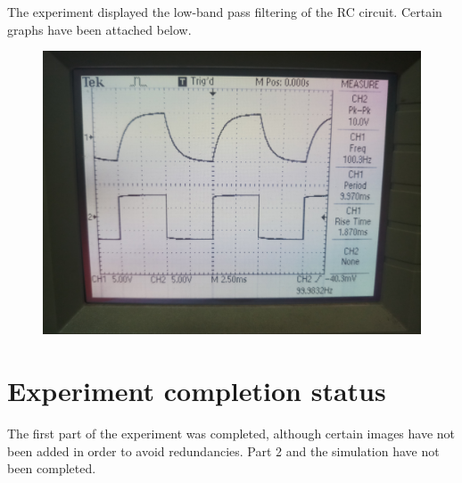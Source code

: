 \documentclass[12pt]{article}
\begin{document}
The experiment displayed the low-band pass filtering of the RC circuit. Certain graphs have been attached below.
\begin{figure}[h!]

\includegraphics[scale = 0.1]{1.jpg}
\end{figure}


\section{Experiment completion status}
The first part of the experiment was completed, although certain images have not been added in order to avoid redundancies. Part 2 and the simulation have not been completed.
\end{document}
